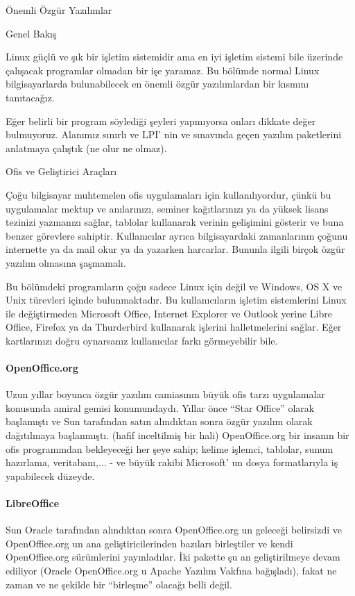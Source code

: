 \documentclass[10pt,a5paper]{book}
\begin{document}
\begin{section}{Önemli Özgür Yazılımlar}
\begin{subsection}{Genel Bakış}

Linux güçlü ve şık bir işletim sistemidir ama en iyi işletim sistemi bile üzerinde çalışacak programlar olmadan bir işe yaramaz. Bu bölümde normal Linux bilgisayarlarda bulunabilecek en önemli özgür yazılımlardan bir kısmını tanıtacağız.

Eğer belirli bir program söylediği şeyleri yapmıyorsa onları dikkate değer bulmuyoruz. Alanımız sınırlı ve LPI' nin ve sınavında geçen yazılım paketlerini anlatmaya çalıştık (ne olur ne olmaz).
\end{subsection}
\begin{subsection}{Ofis ve Geliştirici Araçları}

Çoğu bilgisayar muhtemelen ofis uygulamaları için kullanılıyordur, çünkü bu uygulamalar mektup ve anılarınızı, seminer kağıtlarınızı ya da yüksek lisans tezinizi yazmanızı sağlar, tablolar kullanarak verinin gelişimini gösterir ve buna benzer görevlere sahiptir. Kullanıcılar ayrıca bilgisayardaki zamanlarının çoğunu internette ya da mail okur ya da yazarken harcarlar. Bununla ilgili birçok özgür yazılım olmasına şaşmamalı.

Bu bölümdeki programların çoğu sadece Linux için değil ve Windows, OS X ve Unix türevleri içinde bulunmaktadır. Bu kullanıcıların işletim sistemlerini Linux ile değiştirmeden Microsoft Office, Internet Explorer ve Outlook yerine Libre Office, Firefox ya da Thurderbird kullanarak işlerini halletmelerini sağlar. Eğer kartlarınızı doğru oynarsanız kullanıcılar farkı görmeyebilir bile.
\paragraph{OpenOffice.org}{Uzun yıllar boyunca özgür yazılım camiasının büyük ofis tarzı uygulamalar konusunda amiral gemisi konumundaydı. Yıllar önce “Star Office” olarak başlamıştı ve Sun tarafından satın alındıktan sonra özgür yazılım olarak dağıtılmaya başlanmıştı. (hafif inceltilmiş bir hali) OpenOffice.org bir insanın bir ofis programından bekleyeceği her şeye sahip; kelime işlemci, tablolar, sunum hazırlama, veritabanı,... - ve büyük rakibi Microsoft' un dosya formatlarıyla iş yapabilecek düzeyde.}
\paragraph{LibreOffice}{Sun Oracle tarafından alındıktan sonra OpenOffice.org un geleceği belirsizdi ve OpenOffice.org un ana geliştiricilerinden bazıları birleştiler ve kendi OpenOffice.org sürümlerini yayınladılar. İki pakette şu an geliştirilmeye devam ediliyor (Oracle OpenOffice.org u Apache Yazılım Vakfına bağışladı), fakat ne zaman ve ne şekilde bir “birleşme” olacağı belli değil.}


\end{subsection}
\end{section}
\end{document}
